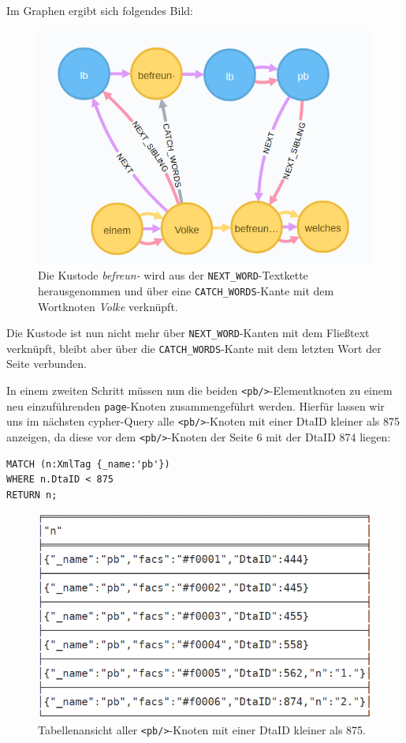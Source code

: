 \documentclass[ngerman,]{scrreprt}
\begin{document}
Im Graphen ergibt sich folgendes Bild:

\begin{figure}
\centering
\includegraphics{Bilder/TEI2Graph/fw-catch-words.png}
\caption{Die Kustode \emph{befreun-} wird aus der \texttt{NEXT\_WORD}-Textkette herausgenommen und über eine \texttt{CATCH\_WORDS}-Kante mit dem Wortknoten \emph{Volke} verknüpft.}
\end{figure}

Die Kustode ist nun nicht mehr über \texttt{NEXT\_WORD}-Kanten mit dem Fließtext verknüpft, bleibt aber über die \texttt{CATCH\_WORDS}-Kante mit dem letzten Wort der Seite verbunden.

In einem zweiten Schritt müssen nun die beiden \texttt{\textless{}pb/\textgreater{}}-Elementknoten zu einem neu einzuführenden \texttt{page}-Knoten zusammengeführt werden. Hierfür lassen wir uns im nächsten cypher-Query alle \texttt{\textless{}pb/\textgreater{}}-Knoten mit einer DtaID kleiner als 875 anzeigen, da diese vor dem \texttt{\textless{}pb/\textgreater{}}-Knoten der Seite 6 mit der DtaID 874 liegen:

\begin{verbatim}
MATCH (n:XmlTag {_name:'pb'})
WHERE n.DtaID < 875
RETURN n;
\end{verbatim}

\begin{figure}
\centering
\includegraphics{Bilder/TEI2Graph/pb-Element-Tabelle.png}
\caption{Tabellenansicht aller \texttt{\textless{}pb/\textgreater{}}-Knoten mit einer DtaID kleiner als 875.}
\end{figure}
\end{document}

